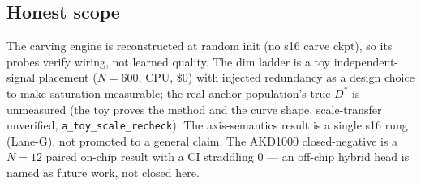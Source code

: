 \subsection{Honest scope}
\label{app:kosmos-scope}

The carving engine is reconstructed at random init (no s16 carve ckpt), so its
probes verify wiring, not learned quality. The dim ladder is a toy
independent-signal placement ($N=600$, CPU, \$0) with injected redundancy as a
design choice to make saturation measurable; the real anchor population's true
$D^\ast$ is unmeasured (the toy proves the method and the curve shape,
scale-transfer unverified, \texttt{a\_toy\_scale\_recheck}). The axis-semantics
result is a single s16 rung (Lane-G), not promoted to a general claim. The AKD1000
closed-negative is a $N=12$ paired on-chip result with a CI straddling $0$ --- an
off-chip hybrid head is named as future work, not closed here.
